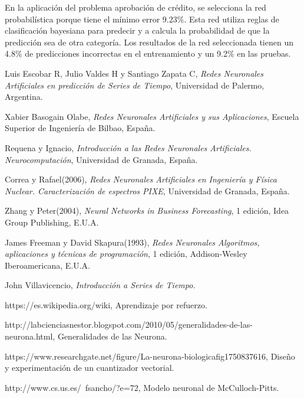 \documentclass[11pt,titlepage]{report}
\begin{document}
En la aplicación del problema aprobación de crédito, se selecciona la red probabilística porque tiene el mínimo error 9.23\%. Esta red utiliza reglas de clasificación bayesiana para predecir y a calcula la probabilidad de que la predicción sea de otra categoría. Los resultados de la red seleccionada tienen un 4.8\% de predicciones incorrectas en el entrenamiento y un 9.2\% en las pruebas.





\newpage

\begin{thebibliography}{12}
	
Luis Escobar R, Julio Valdes H y Santiago Zapata C, \textit{Redes Neuronales Artificiales en predicción de Series de Tiempo}, Universidad de Palermo, Argentina.
	
Xabier Basogain Olabe, \textit{Redes Neuronales Artificiales y sus Aplicaciones}, Escuela Superior de Ingeniería de Bilbao, España.

 Requena y Ignacio, \textit{Introducción a las Redes Neuronales Artificiales. Neurocomputación}, Universidad de Granada, España.

Correa y Rafael(2006), \textit{Redes Neuronales Artificiales en Ingeniería y Física Nuclear. Caracterización de espectros PIXE}, Universidad de Granada, España.

Zhang y Peter(2004), \textit{Neural Networks in Business Forecasting}, 1 edición, Idea Group Publishing, E.U.A.

James Freeman y David Skapura(1993), \textit{Redes Neuronales Algoritmos, aplicaciones y técnicas de programación}, 1 edición, Addison-Wesley Iberoamericana, E.U.A.


John Villavicencio, \textit{Introducción a Series de Tiempo.}

https://es.wikipedia.org/wiki, Aprendizaje por refuerzo.

http://labcienciasnestor.blogspot.com/2010/05/generalidades-de-las-neurona.html, Generalidades de las Neurona.

https://www.researchgate.net/figure/La-neurona-biologicafig1750837616, Diseño y experimentación de un cuantizador vectorial.
 
http://www.cs.us.es/~fsancho/?e=72, Modelo neuronal de McCulloch-Pitts.
  

\end{thebibliography}
\end{document}
